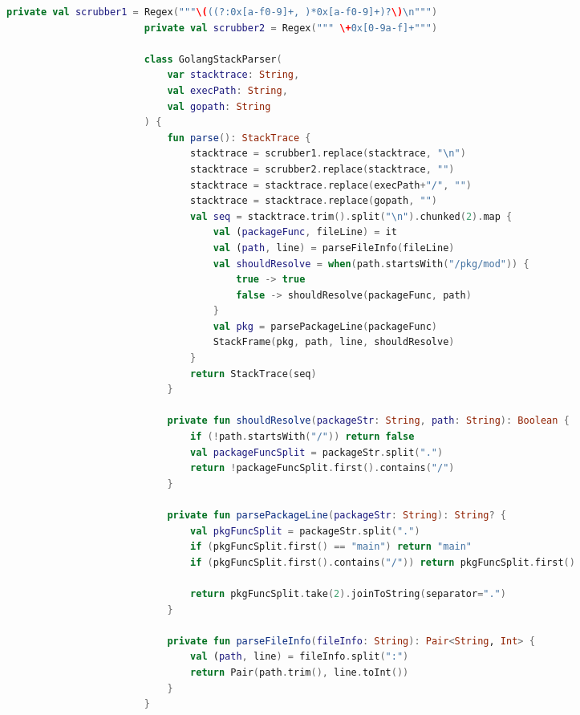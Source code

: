 \documentclass[12pt,pdftex,titlepage]{report}
\begin{document}
                \newpage
                \begin{spacing}{1.0}
                    \begin{lstlisting}[language=Kotlin, gobble=24, label={lst:goparser}]
                        private val scrubber1 = Regex("""\(((?:0x[a-f0-9]+, )*0x[a-f0-9]+)?\)\n""")
                        private val scrubber2 = Regex(""" \+0x[0-9a-f]+""")
                        
                        class GolangStackParser(
                            var stacktrace: String,
                            val execPath: String,
                            val gopath: String
                        ) {
                            fun parse(): StackTrace {
                                stacktrace = scrubber1.replace(stacktrace, "\n")
                                stacktrace = scrubber2.replace(stacktrace, "")
                                stacktrace = stacktrace.replace(execPath+"/", "")
                                stacktrace = stacktrace.replace(gopath, "")
                                val seq = stacktrace.trim().split("\n").chunked(2).map {
                                    val (packageFunc, fileLine) = it
                                    val (path, line) = parseFileInfo(fileLine) 
                                    val shouldResolve = when(path.startsWith("/pkg/mod")) {
                                        true -> true
                                        false -> shouldResolve(packageFunc, path)
                                    } 
                                    val pkg = parsePackageLine(packageFunc)
                                    StackFrame(pkg, path, line, shouldResolve)
                                }
                                return StackTrace(seq)
                            }
                        
                            private fun shouldResolve(packageStr: String, path: String): Boolean {
                                if (!path.startsWith("/")) return false
                                val packageFuncSplit = packageStr.split(".")
                                return !packageFuncSplit.first().contains("/")
                            }
                        
                            private fun parsePackageLine(packageStr: String): String? {
                                val pkgFuncSplit = packageStr.split(".")
                                if (pkgFuncSplit.first() == "main") return "main"
                                if (pkgFuncSplit.first().contains("/")) return pkgFuncSplit.first()

                                return pkgFuncSplit.take(2).joinToString(separator=".")
                            }
                        
                            private fun parseFileInfo(fileInfo: String): Pair<String, Int> {
                                val (path, line) = fileInfo.split(":")
                                return Pair(path.trim(), line.toInt())
                            }
                        }
                    \end{lstlisting}
                \end{spacing}
            
\end{document}
